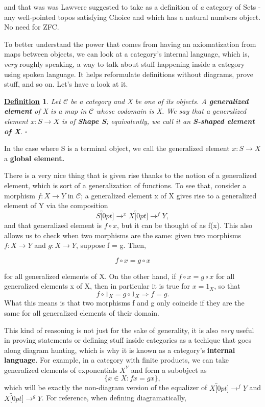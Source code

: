 \documentclass{article}
\newtheorem*{def*}{\underline{Definition}}
\begin{document}
and that was was Lawvere suggested to take as a definition of \textit{a} category of Sets - any well-pointed topos satisfying Choice and which has a natural numbers object. No need for ZFC.

To better understand the power that comes from having an axiomatization from maps between objects, we can look at a category's internal language, which is, \textit{very} roughly speaking, a way to talk about stuff happening inside a category using spoken language. It helps reformulate definitions without diagrams, prove stuff, and so on. Let's have a look at it.

\begin{def*}
	Let \(\mathcal{C}\) be a category and X be one of its objects. A \textbf{generalized element} of X is a map in \(\mathcal{C}\) whose codomain is X. We say that a generalized element \(x:S\rightarrow X\) is of \textbf{Shape S}; equivalently, we call it an \textbf{S-shaped element of X}. \(\square\)
\end{def*}
In the case where S is a terminal object, we call the generalized element \(x:S\rightarrow X\) a \textbf{global element.}

There is a very nice thing that is given rise thanks to the notion of a generalized element, which is sort of a generalization of functions. To see that, consider a morphism \(f:X\rightarrow Y\) in \(\mathcal{C}\); a generalized element x of X gives rise to a generalized element of Y via the composition
\[
	S\overbracket[0pt]{\rightarrow}^{x}X\overbracket[0pt]{\rightarrow}^{f}Y,
\]
and that generalized element is \(f\circ x\), but it can be thought of as f(x). This also allows us to check when two morphisms are the same: given two morphisms \(f:X\rightarrow Y\) and \(g:X\rightarrow Y\), suppose f = g. Then,

\[
	f\circ x = g \circ x
\]

for all generalized elements of X. On the other hand, if \(f\circ x = g\circ x\) for all generalized elements x of X, then in particular it is true for \(x = 1_{X}\), so that
\[
	f\circ 1_{X} = g\circ 1_{X} \Rightarrow f = g.
\]
What this means is that two morphisms f and g only coincide if they are the same for all generalized elements of their domain.

This kind of reasoning is not just for the sake of generality, it is also \textit{very} useful in proving statements or defining stuff inside categories as a techique that goes along diagram hunting, which is why it is known as a category's \textbf{internal language}. For example, in a category with finite products, we can take generalized elements of exponentials \(X^{Y}\) and form a subobject as
\[
	\{x\in X: fx = gx\},
\]
which will be exactly the non-diagram version of the equalizer of \(X\overbracket[0pt]{\rightarrow}^{f}Y\) and \(X\overbracket[0pt]{\rightarrow}^{g}Y\). For reference, when defining diagramatically,
\end{document}
